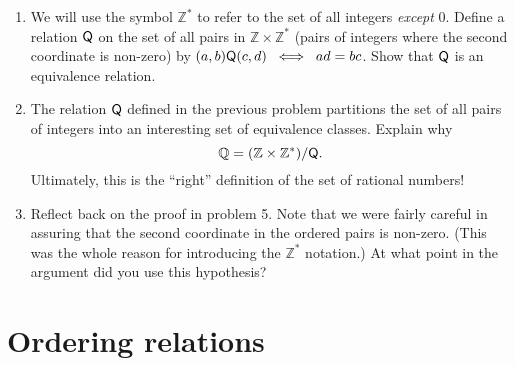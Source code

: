 \documentclass[10pt,]{book}
\theoremstyle{plain}
\theoremstyle{definition}
\theoremstyle{definition}
\numberwithin{equation}{section}
\newcommand{\Integers}{{\mathbb Z}}
\newcommand{\Rationals}{{\mathbb Q}}
\newcommand{\relQ}{\mbox{\textsf Q}}
\begin{document}
\begin{enumerate}[label=(\alph*)]
\item\hypertarget{li-414}{}
          We will use the symbol \(\Integers^{\ast}\) to refer to the set of
          all integers \emph{except} \(0\).  
          Define a relation \(\relQ\) on the set of all pairs in \(\Integers \times \Integers^{\ast}\) (pairs of integers where the second coordinate is non-zero) by
          \((a,b) \relQ (c,d) \; \iff \; ad=bc\).  Show that \(\relQ\) is an 
          equivalence relation.
\item\hypertarget{li-415}{}
          The relation \(\relQ\) defined in the previous problem partitions
          the set of all pairs of integers into an interesting set of equivalence
          classes.  Explain why
          \begin{equation*}
            \Rationals  =  (\Integers \times \Integers^{\ast}) / \relQ.
          \end{equation*}
          Ultimately, this is the ``right'' definition of the set 
          of rational numbers!
\item\hypertarget{li-416}{}
          Reflect back on the proof in problem 5.  Note that we were fairly
          careful in assuring that the second coordinate in the ordered pairs is
          non-zero. (This was the whole reason for introducing the 
          \(\Integers^{\ast}\) notation.)  At what point in the argument did you
          use this hypothesis?
\end{enumerate}
\typeout{************************************************}
\typeout{************************************************}
\section[{Ordering relations}]{Ordering relations}\label{sec_ord_rel}
\end{document}
